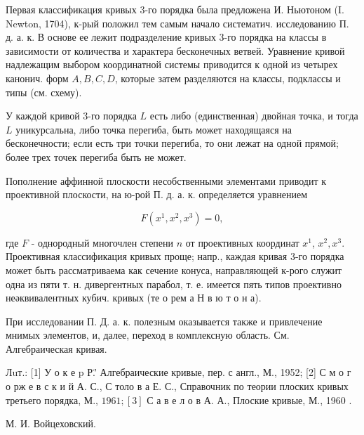 \documentclass[10pt]{article}
\begin{document}
Первая классификация кривых 3-го порядка была предложена И. Ньютоном (I. Newton, 1704), к-рый положил тем самым начало систематич. исследованию П. д. а. к. В основе ее лежит подразделение кривых 3-го порядка на классы в зависимости от количества и характера бесконечных ветвей. Уравнение кривой надлежащим выбором координатной системы приводится к одной из четырех канонич. форм $A, B, C, D$, которые затем разделяются на классы, подклассы и типы (см. схему).



У каждой кривой 3-го порядка $L$ есть либо (единственная) двойная точка, и тогда $L$ уникурсальна, либо точка перегиба, быть может находящаяся на бесконечности; если есть три точки перегиба, то они лежат на одной прямой; более трех точек перегиба быть не может.



Пополнение аффинной плоскости несобственными элементами приводит к проективной плоскости, на ю-рой П. д. а. к. определяется уравнением



\[

F\left(x^{1}, x^{2}, x^{3}\right)=0,

\]



где $F$ - однородный многочлен степени $n$ от проективных координат $x^{1}$, $x^{2}, x^{3}$. Проективная классификация кривых проще; напр., каждая кривая 3-го порядка может быть рассматриваема как сечение конуса, направляющей к-рого служит одна из пяти т. н. дивергентных парабол, т. е. имеется пять типов проективно неәквивалентных кубич. кривых (те о рем а Н в ю т о н а).



При исследовании П. Д. а. к. полезным оказывается также и привлечение мнимых элементов, и, далее, переход в комплексную область. См. Алгебраическая кривая.



Лuт.: [1] У о к е p Р.’̈ Алгебраические кривые, пер. с англ., М., 1952; [2] С м о г о рж е в с к и й А. С., С толо в а Е. С., Справочник по теории плоских кривых третьего порядка, М., $1961 ;[3]$ С а в е л о в А. А., Плоские кривые, М., 1960 .



М. И. Войцеховский.
\end{document}
